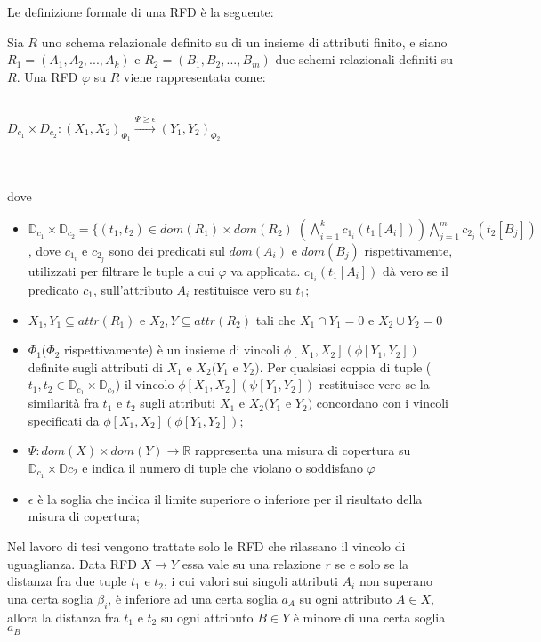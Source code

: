 Le definizione formale di una RFD è la seguente:
\begin{theorem}
Sia $R$ uno schema relazionale definito su di un insieme di attributi finito, e siano $R_1=(A_1,A_2,...,A_k)$ e $R_2=(B_1,B_2,...,B_m)$ due schemi relazionali definiti su $R$. Una RFD $\varphi$ su $R$ viene rappresentata come:
\\
\\
\centerline{$D_{c_1} \times D_{c_2}:(X_1,X_2)_{\Phi_1} \xrightarrow{\Psi\geq\epsilon}(Y_1,Y_2)_{\Phi_2}$}
\\
\\
dove 
\begin{itemize}
\item $\mathbb{D}_{c_1}\times \mathbb{D}_{c_2} = \{(t_1,t_2)\in dom(R_1)\times dom(R_2)|(\bigwedge_{i=1}^{k} c_{1_i}(t_1[A_i])) \bigwedge_{j=1}^{m} c_{2_j}(t_2[B_j])$, dove $c_{1_i}$ e $c_{2_j}$ sono dei predicati sul $dom(A_i)$ e $dom(B_j)$ rispettivamente, utilizzati per filtrare le tuple a cui $\varphi$ va applicata.
$c_{1_i}(t_1[A_i])$ dà vero se il predicato $c_1$, sull'attributo $A_i$ restituisce vero su $t_1$;
\item $X_1,Y_1 \subseteq attr(R_1)$ e $X_2,Y\subseteq attr(R_2)$ tali che $X_1\cap Y_1=0$ e $X_2\cup Y_2=0 $
\item $\Phi_1$($\Phi_2$ rispettivamente) è un insieme di vincoli $\phi[X_1,X_2](\phi[Y_1,Y_2])$ definite sugli attributi di $X_1$ e $X_2(Y_1$ e $Y_2)$. Per qualsiasi coppia di tuple ($t_1,t_2 \in \mathbb{D}_{c_1} \times \mathbb{D}_{c_2}$) il vincolo $\phi[X_1,X_2](\psi[Y_1,Y_2])$ restituisce vero se la similarità fra $t_1$ e $t_2$ sugli attributi $X_1$ e $X_2(Y_1$ e $Y_2)$ concordano con i vincoli specificati da $\phi[X_1,X_2](\phi[Y_1,Y_2])$;
\item $\Psi: dom(X) \times dom(Y)\xrightarrow{}\mathbb{R}$ rappresenta una misura di copertura su $\mathbb{D}_{c_1} \times \mathbb{D}{c_2}$ e indica il numero di tuple che violano o soddisfano $\varphi$
\item $\epsilon$ è la soglia che indica il limite superiore o inferiore per il risultato della misura di copertura;
\end{itemize}
\end{theorem}

Nel lavoro di tesi vengono trattate solo le RFD che rilassano il vincolo di uguaglianza. Data RFD $X \xrightarrow{} Y$ essa vale su una relazione $r$ se e solo se la distanza fra due tuple $t_1$ e $t_2$, i cui valori sui singoli attributi $A_i$ non superano una certa soglia $\beta_i$, è inferiore ad una certa soglia $a_A$ su ogni attributo $A \in X$, allora la distanza fra $t_1$ e $t_2$ su ogni attributo $B \in Y$ è minore di una certa soglia $a_B$ 




